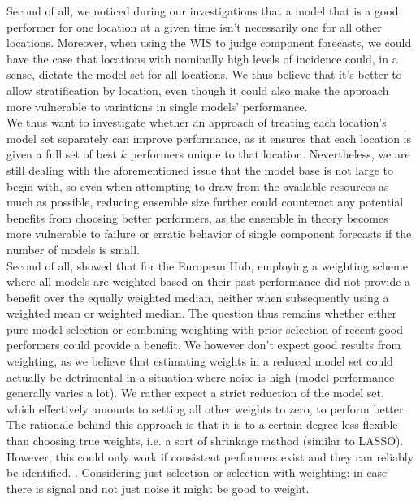 Second of all, we noticed during our investigations that a model that is a good performer for one location at a given time isn't necessarily one for all other locations. Moreover, when using the WIS to judge component forecasts, we could have the case that locations with nominally high levels of incidence could, in a sense, dictate the model set for all locations. We thus believe that it's better to allow stratification by location, even though it could also make the approach more vulnerable to variations in single models' performance. \\
We thus want to investigate whether an approach of treating each location's model set separately can improve performance, as it ensures that each location is given a full set of best $k$ performers unique to that location. Nevertheless, we are still dealing with the aforementioned issue that the model base is not large to begin with, so even when attempting to draw from the available resources as much as possible, reducing ensemble size further could counteract any potential benefits from choosing better performers, as the ensemble in theory becomes more vulnerable to failure or erratic behavior of single component forecasts if the number of models is small. \medskip\\%
Second of all, \cite{sherratt_european_2022} showed that for the European Hub, employing a weighting scheme where all models are weighted based on their past performance did not provide a benefit over the equally weighted median, neither when subsequently using a weighted mean or weighted median. The question thus remains whether either pure model selection or combining weighting with prior selection of recent good performers could provide a benefit. We however don't expect good results from weighting, as we believe that estimating weights in a reduced model set could actually be detrimental in a situation where noise is high (model performance generally varies a lot). We rather expect a strict reduction of the model set, which effectively amounts to setting all other weights to zero, to perform better. The rationale behind this approach is that it is to a certain degree less flexible than choosing true weights, i.e. a sort of shrinkage method (similar to LASSO). However, this could only work if consistent performers exist and they can reliably be identified. . Considering just selection or selection with weighting: in case there is signal and not just noise it might be good to weight.\\
